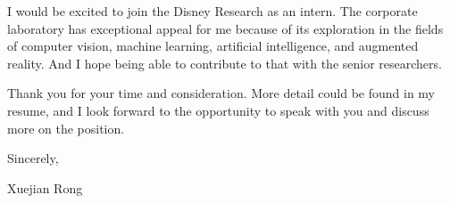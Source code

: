 \documentclass{scrartcl}
\newlength{\datebox}\settowidth{\datebox}{Spring 2014} %
\newcommand{\NewEntry}[3]{\noindent\hangindent=0em\hangafter=0 \parbox{\datebox}{\small \textit{#1}}\hspace{1.5em} #2 #3 %
\vspace{0.5em}} %
\begin{document}
\begin{cv}{}
\vspace{1em}

I would be excited to join the Disney Research as an intern. The corporate laboratory has exceptional appeal for me because of its exploration in the fields of computer vision, machine learning, artificial intelligence, and augmented reality. And I hope being able to contribute to that with the senior researchers.

\vspace{1em}

Thank you for your time and consideration. More detail could be found in my resume, and I look forward to the opportunity to speak with you and discuss more on the position.

\vspace{2em}

Sincerely,

\vspace{1em}

Xuejian Rong








\end{cv}
\end{document}
